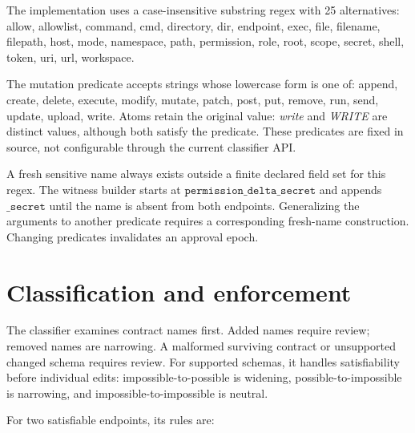 The implementation uses a case-insensitive substring regex with 25 alternatives: allow, allowlist, command, cmd, directory, dir, endpoint, exec, file, filename, filepath, host, mode, namespace, path, permission, role, root, scope, secret, shell, token, uri, url, workspace.

The mutation predicate accepts strings whose lowercase form is one of: append, create, delete, execute, modify, mutate, patch, post, put, remove, run, send, update, upload, write. Atoms retain the original value: \emph{write} and \emph{WRITE} are distinct values, although both satisfy the predicate. These predicates are fixed in source, not configurable through the current classifier API.

A fresh sensitive name always exists outside a finite declared field set for this regex. The witness builder starts at \(\texttt{permission\_delta\_secret}\) and appends \(\texttt{\_secret}\) until the name is absent from both endpoints. Generalizing the arguments to another predicate requires a corresponding fresh-name construction. Changing predicates invalidates an approval epoch.

\section{Classification and enforcement}\label{classification-and-enforcement}

The classifier examines contract names first. Added names require review; removed names are narrowing. A malformed surviving contract or unsupported changed schema requires review. For supported schemas, it handles satisfiability before individual edits: impossible-to-possible is widening, possible-to-impossible is narrowing, and impossible-to-impossible is neutral.

For two satisfiable endpoints, its rules are:

